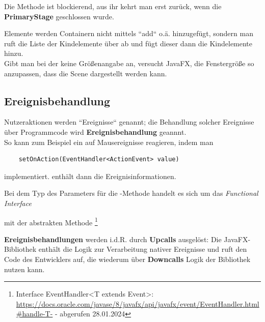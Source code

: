 \begin{tcolorbox}
    Die Methode  ist blockierend, aus ihr kehrt man erst zurück, wenn die \textbf{PrimaryStage} geschlossen wurde.
\end{tcolorbox}

\noindent
Elemente werden Containern nicht mittels ``add`` o.ä. hinzugefügt, sondern man ruft die Liste der Kindelemente über  ab und fügt dieser dann die Kindelemente hinzu.\\

\noindent
Gibt man bei der  keine Größenangabe an, versucht JavaFX, die Fenstergröße so anzupassen, dass die Scene dargestellt werden kann.

\subsection{Ereignisbehandlung}

Nutzeraktionen werden ``Ereignisse`` genannt; die Behandlung solcher Ereignisse über Programmcode wird \textbf{Ereignisbehandlung} geannnt.\\

\noindent
So kann zum Beispiel ein  auf Mausereignisse reagieren, indem man

\begin{verbatim}
    setOnAction(EventHandler<ActionEvent> value)
\end{verbatim}

implementiert.  enthält dann die Ereignisinformationen.

\begin{tcolorbox}
    Bei dem Typ des Parameters für die -Methode handelt es sich um das \textit{Functional Interface}
     \begin{center}
     \end{center}
    mit der abstrakten Methode \footnote{
        Interface EventHandler<T extends Event>: \url{https://docs.oracle.com/javase/8/javafx/api/javafx/event/EventHandler.html#handle-T-} - abgerufen 28.01.2024
    }
\end{tcolorbox}

\noindent
\textbf{Ereignisbehandlungen} werden i.d.R. durch \textbf{Upcalls} ausgelöst: Die JavaFX-Bibliothek enthält die Logik zur Verarbeitung nativer Ereignisse und ruft den Code des Entwicklers auf, die wiederum über \textbf{Downcalls} Logik der Bibliothek nutzen kann.


